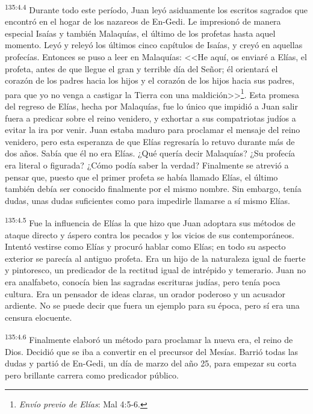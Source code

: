\par 
\textsuperscript{135:4.4} Durante todo este período, Juan leyó asiduamente los escritos sagrados que encontró en el hogar de los nazareos de En-Gedi. Le impresionó de manera especial Isaías y también Malaquías, el último de los profetas hasta aquel momento. Leyó y releyó los últimos cinco capítulos de Isaías, y creyó en aquellas profecías. Entonces se puso a leer en Malaquías: <<He aquí, os enviaré a Elías, el profeta, antes de que llegue el gran y terrible día del Señor; él orientará el corazón de los padres hacia los hijos y el corazón de los hijos hacia sus padres, para que yo no venga a castigar la Tierra con una maldición>>\footnote{\textit{Envío previo de Elías}: Mal 4:5-6.}. Esta promesa del regreso de Elías, hecha por Malaquías, fue lo único que impidió a Juan salir fuera a predicar sobre el reino venidero, y exhortar a sus compatriotas judíos a evitar la ira por venir. Juan estaba maduro para proclamar el mensaje del reino venidero, pero esta esperanza de que Elías regresaría lo retuvo durante más de dos años. Sabía que él no era Elías. ¿Qué quería decir Malaquías? ¿Su profecía era literal o figurada? ¿Cómo podía saber la verdad? Finalmente se atrevió a pensar que, puesto que el primer profeta se había llamado Elías, el último también debía ser conocido finalmente por el mismo nombre. Sin embargo, tenía dudas, unas dudas suficientes como para impedirle llamarse a sí mismo Elías.

\par 
\textsuperscript{135:4.5} Fue la influencia de Elías la que hizo que Juan adoptara sus métodos de ataque directo y áspero contra los pecados y los vicios de sus contemporáneos. Intentó vestirse como Elías y procuró hablar como Elías; en todo su aspecto exterior se parecía al antiguo profeta. Era un hijo de la naturaleza igual de fuerte y pintoresco, un predicador de la rectitud igual de intrépido y temerario. Juan no era analfabeto, conocía bien las sagradas escrituras judías, pero tenía poca cultura. Era un pensador de ideas claras, un orador poderoso y un acusador ardiente. No se puede decir que fuera un ejemplo para su época, pero sí era una censura elocuente.

\par 
\textsuperscript{135:4.6} Finalmente elaboró un método para proclamar la nueva era, el reino de Dios. Decidió que se iba a convertir en el precursor del Mesías. Barrió todas las dudas y partió de En-Gedi, un día de marzo del año 25, para empezar su corta pero brillante carrera como predicador público.

